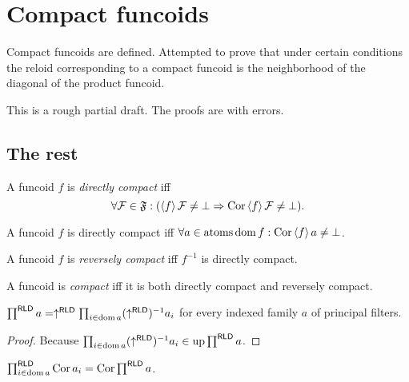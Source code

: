\chapter{Compact funcoids}

Compact funcoids are defined. Attempted to prove that under certain conditions the
reloid corresponding to a compact funcoid is the neighborhood of the diagonal
of the product funcoid.

This is a rough partial draft. The proofs are with errors.


\section{The rest}

\begin{defn}
  A funcoid $f$ is \emph{directly compact} iff
  \[ \forall \mathcal{F} \in \mathfrak{F}: (\left\langle f\right\rangle
     \mathcal{F} \neq \bot \Rightarrow \operatorname{Cor} \left\langle f\right\rangle \mathcal{F}
     \neq \bot). \]
\end{defn}

\begin{obvious}
A funcoid $f$ is directly compact iff $\forall a \in \operatorname{atoms} \operatorname{dom} f :
\operatorname{Cor} \left\langle f\right\rangle a \neq \bot$.
\end{obvious}

\begin{defn}
  A funcoid $f$ is \emph{reversely compact} iff $f^{- 1}$ is directly
  compact.
\end{defn}

\begin{defn}
  A funcoid is \emph{compact} iff it is both directly compact and reversely
  compact.
\end{defn}

\begin{prop}
  $\prod^{\mathsf{RLD}} a = \uparrow^{\mathsf{RLD}} \prod_{i \in
  \operatorname{dom} a} (\uparrow^{\mathsf{RLD}})^{- 1} a_i$ for every indexed
  family $a$ of principal filters.
\end{prop}

\begin{proof}
Because $\prod_{i \in \operatorname{dom} a} (\uparrow^{\mathsf{RLD}})^{- 1} a_i
\in \operatorname{up} \prod^{\mathsf{RLD}} a$.
\end{proof}

\begin{lem}
$\prod^{\mathsf{RLD}}_{i \in \operatorname{dom} a} \operatorname{Cor} a_i = \operatorname{Cor}
\prod^{\mathsf{RLD}} a$.
\end{lem}

